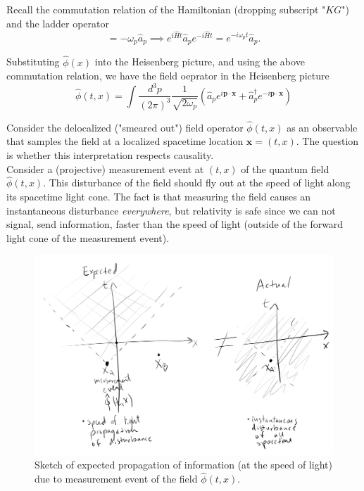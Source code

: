 \noindent Recall the commutation relation of the Hamiltonian (dropping subscript "$KG$") and the ladder operator
\begin{equation}
[ \hat{H}, \hat{a}_p ] = -\omega_p \hat{a}_p \implies e^{i \hat{H} t} \hat{a}_p e^{-i \hat{H} t} = e^{-i\omega_p t} \hat{a}_p.
\end{equation} 

\noindent Substituting $\hat{\phi}(x)$ into the Heisenberg picture, and using the above commutation relation, we have the field oeprator in the Heisenberg picture
\begin{equation}
\hat{\phi}(t, x) = \int \frac{d^3 p}{(2\pi)^3} \frac{1}{\sqrt{2 \omega_p}} \left( \hat{a}_p e^{i \textbf{p} \cdot \textbf{x}} + \hat{a}_p^\dagger e^{-i \textbf{p} \cdot \textbf{x}} \right)
\end{equation}

\noindent Consider the delocalized ("smeared out") field operator $\hat{\phi}(t,x)$ as an observable that samples the field at a localized spacetime location $\textbf{x}=(t,x)$. The question is whether this interpretation respects causality. \\

\noindent Consider a (projective) measurement event at $(t,x)$ of the quantum field $\hat{\phi}(t,x)$. This disturbance of the field should fly out at the speed of light along its spacetime light cone. The fact is that measuring the field causes an instantaneous disturbance \textit{everywhere}, but relativity is safe since we can not signal, send information, faster than the speed of light (outside of the forward light cone of the measurement event). \\

\begin{figure}[H]
	\centering
	\includegraphics[scale=0.3]{lightcone.png}
	\caption{Sketch of expected propagation of information (at the speed of light) due to measurement event of the field $\hat{\phi}(t,x)$.}
\end{figure}

